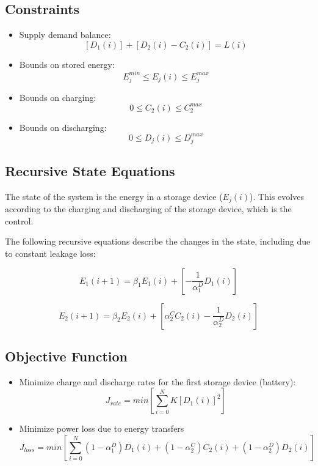 \documentclass{article}
\begin{document}
	\subsection{Constraints}
	\begin{itemize}
		\item Supply demand balance: 
		\[ \left[D_{1}(i)\right] + \left[D_{2}(i) - C_{2}(i)\right] = L(i) \]
						
		\item Bounds on stored energy: 
		\[E_{j}^{min}\leq E_{j}(i)\leq E_{j}^{max}\]
		\item Bounds on charging:
		\[0\leq C_{2}(i)\leq C_{2}^{max}\]
		\item Bounds on discharging:
		\[0\leq D_{j}(i)\leq D_{j}^{max}\]
	\end{itemize}

	\subsection{Recursive State Equations}
	 The state of the system is the energy in a storage device ($E_{j}(i)$). This evolves according to the charging and discharging of the storage device, which is the control.
	 
	 The following recursive equations describe the changes in the state, including due to constant leakage loss:
	 
	 \[E_{1}(i+1)=\beta_{1}E_{1}(i)+\left[-\frac{1}{\alpha_{1}^{D}}D_{1}(i)\right] \]
	 
	 \[E_{2}(i+1)=\beta_{2}E_{2}(i)+\left[\alpha_{2}^{C}C_{2}(i)-\frac{1}{\alpha_{2}^{D}}D_{2}(i)\right] \]
	 

	\subsection{Objective Function}
	\begin{itemize}
		\item Minimize charge and discharge rates
		 for the first storage device (battery):
		 \[J_{rate}=min\left[\sum_{i=0}^{N}K\left[D_{1}(i)\right]^{2}\right]\]
 		\item Minimize power loss due to energy transfers
		 \[J_{loss}=min\left[\sum_{i=0}^{N}
		 (1-\alpha_{1}^{D})D_{1}(i)+
		 (1-\alpha_{2}^{C})C_{2}(i)+
 		 (1-\alpha_{2}^{D})D_{2}(i)
		  \right]\]
	\end{itemize}
	
	
	
\end{document}
